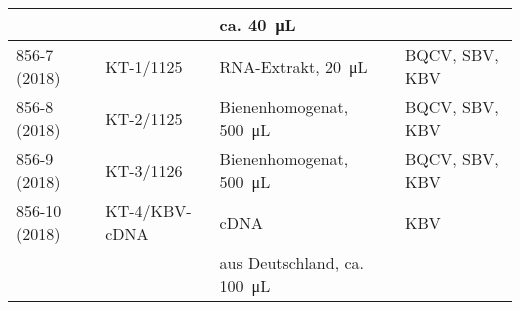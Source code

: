 \begin{table}
\begin{tabular}{|l|l|l|l|}
                        &                       & ca. \SI{40}{\micro\liter} &\\
        \hline
        856-7 (2018)    & KT-1/1125             & RNA-Extrakt, \SI{20}{\micro\liter} & BQCV, SBV, KBV\\
        \hline
        856-8 (2018)    & KT-2/1125             & Bienenhomogenat, \SI{500}{\micro\liter} & BQCV, SBV, KBV\\
        \hline
        856-9 (2018)    & KT-3/1126             & Bienenhomogenat, \SI{500}{\micro\liter} & BQCV, SBV, KBV\\
        \hline
        856-10 (2018)   & KT-4/KBV-cDNA         & cDNA \citep{siede2005}    & KBV\\
                        &                       & aus Deutschland, ca. \SI{100}{\micro\liter} &\\
        \hline
    \end{tabular}
\end{table}